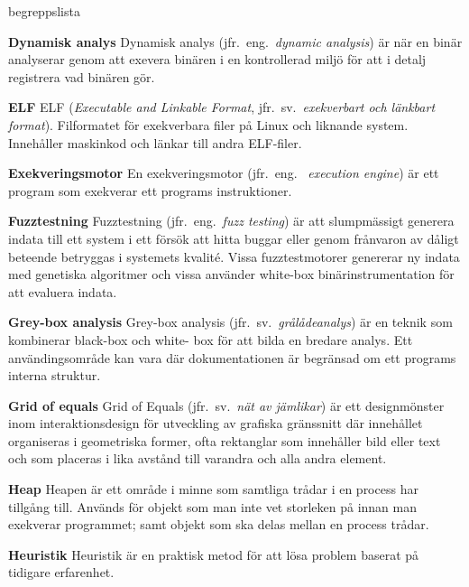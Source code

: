 \begin{labeling}{begreppslista}
    \item [\textbf{Dynamisk analys}] Dynamisk analys (jfr.\ eng.\ \emph{dynamic
        analysis}) är när en binär analyserar genom att exevera binären i en
    kontrollerad miljö för att i detalj registrera vad binären gör.

    \item [\textbf{ELF}] ELF (\emph{Executable and Linkable Format}, jfr.\ sv.\
    \emph{exekverbart och länkbart format}). Filformatet för exekverbara filer
    på Linux och liknande system. Innehåller maskinkod och länkar till andra
    ELF-filer.

    \item [\textbf{Exekveringsmotor}] En exekveringsmotor (jfr.\ eng.
    \ \emph{execution engine}) är ett program som exekverar ett programs
    instruktioner.

    \item [\textbf{Fuzztestning}] Fuzztestning (jfr.\ eng.\ \emph{fuzz testing})
    är att slumpmässigt generera indata till ett system i ett försök att hitta
    buggar eller genom frånvaron av dåligt beteende betryggas i systemets
    kvalité. Vissa fuzztestmotorer genererar ny indata med genetiska algoritmer
    och vissa använder white-box binärinstrumentation för att evaluera indata.

    \item [\textbf{Grey-box analysis}] Grey-box analysis (jfr.\ sv.\
    \emph{grålådeanalys}) är en teknik som kombinerar black-box och white-
    box för att bilda en bredare analys. Ett användingsområde kan vara där
    dokumentationen är begränsad om ett programs interna struktur.

    \item [\textbf{Grid of equals}] Grid of Equals (jfr.\ sv.\ \emph{nät av
        jämlikar}) är ett designmönster inom interaktionsdesign för utveckling av
    grafiska gränssnitt där innehållet organiseras i geometriska former, ofta
    rektanglar som innehåller bild eller text och som placeras i lika avstånd
    till varandra och alla andra element.

    \item [\textbf{Heap}] Heapen är ett område i minne som samtliga trådar i
    en process har tillgång till. Används för objekt som man inte vet storleken på
    innan man exekverar programmet; samt objekt som ska delas mellan en process
    trådar.

    \item [\textbf{Heuristik}] Heuristik är en praktisk metod för att lösa
    problem baserat på tidigare erfarenhet.


\end{labeling}
